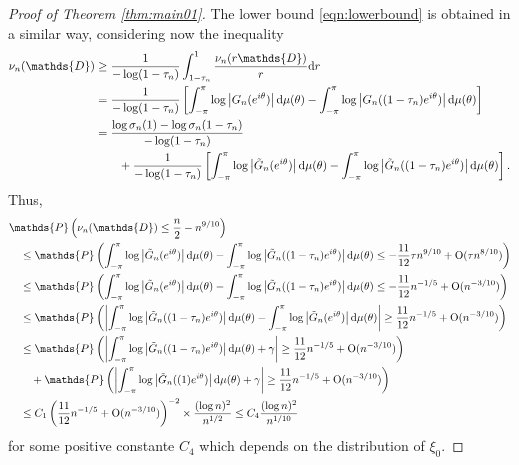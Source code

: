 \documentclass[12pt]{amsart}
\theoremstyle{plain}
\numberwithin{equation}{section}
\renewcommand{\Pr}{\mathbb{P}}
\newcommand{\<}{\langle}
\renewcommand{\>}{\rangle}
\newcommand{\PP}[1]{\left(#1\right)}
\newcommand{\CC}[1]{\left[#1\right]}
\newcommand{\dd}{\textnormal{d}}
\newcommand{\abs}[1]{\left|#1\right|}
\renewcommand{\Pr}[1]{\mathds{P}\left(#1\right)}
\begin{document}
\begin{proof}[Proof of Theorem \ref{thm:main01}]
The lower bound \ref{eqn:lowerbound} is obtained in a similar way, considering now the inequality
\begin{align}
\nu_n(\mathds{D}) & \geq \frac{1}{-\log(1-\tau_n)} \int_{1-\tau_n}^{1} \frac{\nu_n(r\mathds{D})}{r} \dd r \nonumber\\
& = \frac{1}{-\log(1-\tau_n)} \CC{\int_{-\pi}^{\pi} \log \abs{G_n(e^{i\theta})} \dd \mu(\theta) - \int_{-\pi}^{\pi} \log \abs{G_n((1-\tau_n)e^{i\theta})} \dd \mu(\theta)} \nonumber\\
& = \frac{\log\sigma_n(1)-\log\sigma_n(1-\tau_n)}{-\log(1-\tau_n)} \nonumber\\ 
& \quad\quad +\frac{1}{-\log(1-\tau_n)} \CC{\int_{-\pi}^{\pi} \log \abs{\tilde{G}_n(e^{i\theta})} \dd \mu(\theta) - \int_{-\pi}^{\pi} \log \abs{\tilde{G}_n((1-\tau_n)e^{i\theta})} \dd \mu(\theta)}.
\end{align}
Thus,
\begin{align*}
& \Pr{\nu_n(\mathds{D}) \leq \frac{n}{2} - n^{9/10}} \\
& \quad \leq \Pr{\int_{-\pi}^{\pi} \log \abs{\tilde{G}_n(e^{i\theta})} \dd \mu(\theta) - \int_{-\pi}^{\pi} \log \abs{\tilde{G}_n((1-\tau_n)e^{i\theta})} \dd \mu(\theta) \leq -\frac{11}{12}\tau n^{9/10}+\textnormal{O}(\tau n^{8/10}) } \\
& \quad \leq \Pr{\int_{-\pi}^{\pi} \log \abs{\tilde{G}_n(e^{i\theta})} \dd \mu(\theta) - \int_{-\pi}^{\pi} \log \abs{\tilde{G}_n((1-\tau_n)e^{i\theta})} \dd \mu(\theta) \leq  -\frac{11}{12}n^{-1/5}+\textnormal{O}(n^{-3/10}) } \\
& \quad \leq \Pr{\abs{\int_{-\pi}^{\pi} \log \abs{\tilde{G}_n((1-\tau_n)e^{i\theta})} \dd \mu(\theta) - \int_{-\pi}^{\pi} \log \abs{\tilde{G}_n(e^{i\theta})} \dd \mu(\theta) } \geq\frac{11}{12}n^{-1/5}+\textnormal{O}(n^{-3/10}) } \\
& \quad \leq \Pr{\abs{\int_{-\pi}^{\pi} \log \abs{\tilde{G}_n((1-\tau_n)e^{i\theta})} \dd \mu(\theta) + \gamma } \geq \frac{11}{12}n^{-1/5}+\textnormal{O}(n^{-3/10}) } \\
& \quad\quad +  \Pr{\abs{\int_{-\pi}^{\pi} \log \abs{\tilde{G}_n((1)e^{i\theta})} \dd \mu(\theta) + \gamma } \geq  \frac{11}{12}n^{-1/5}+\textnormal{O}(n^{-3/10}) } \\
& \quad \leq C_1 \PP{ \frac{11}{12}n^{-1/5}+\textnormal{O}(n^{-3/10}) }^{-2} \times \frac{(\log n)^2}{n^{1/2}} \leq C_4 \frac{(\log n)^2}{n^{1/10}}
\end{align*}
for some positive constante $C_4$ which depends on the distribution of $\xi_0$.


\end{proof}
\end{document}
